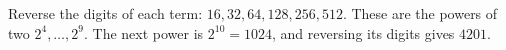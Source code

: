 Reverse the digits of each term: $16,32,64,128,256,512$. These are the powers of two $2^4,\dots,2^9$. The next power is $2^{10}=1024$, and reversing its digits gives $\boxed{4201}$.
